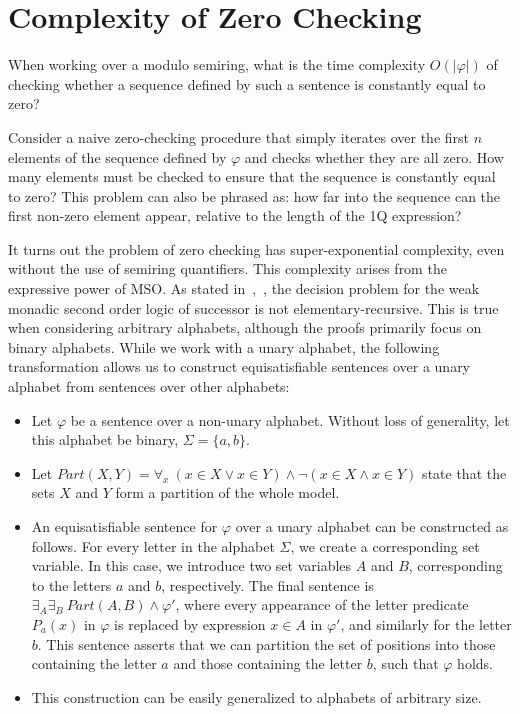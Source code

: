 \documentclass[en]{pracamgr}
\theoremstyle{definition}
\begin{document}
\section{Complexity of Zero Checking}
When working over a modulo semiring, what is the time complexity $O(|\varphi|)$ of checking whether a sequence defined by such a sentence is constantly equal to zero?

Consider a naive zero-checking procedure that simply iterates over the first $n$ elements of the sequence defined by $\varphi$ and checks whether they are all zero. How many elements must be checked to ensure that the sequence is constantly equal to zero? This problem can also be phrased as: how far into the sequence can the first non-zero element appear, relative to the length of the 1Q expression?

It turns out the problem of zero checking has super-exponential complexity, even without the use of semiring quantifiers. This complexity arises from the expressive power of MSO. As stated in~\cite{Stockmeyer},~\cite{Meyer}, the decision problem for the weak monadic second order logic of successor is not elementary-recursive. This is true when considering arbitrary alphabets, although the proofs primarily focus on binary alphabets. While we work with a unary alphabet, the following transformation allows us to construct equisatisfiable sentences over a unary alphabet from sentences over other alphabets:

\begin{itemize}
    \item Let $\varphi$ be a sentence over a non-unary alphabet. Without loss of generality, let this alphabet be binary, $\Sigma = \{a,b\}$.
    \item Let $Part(X,Y) = \forall_x \ (x \in X \lor x \in Y) \land \neg(x \in X \land x \in Y)$ state that the sets $X$ and $Y$ form a partition of the whole model.
    \item An equisatisfiable sentence for $\varphi$ over a unary alphabet can be constructed as follows. For every letter in the alphabet $\Sigma$, we create a corresponding set variable. In this case, we introduce two set variables $A$ and $B$, corresponding to the letters $a$ and $b$, respectively. The final sentence is $\exists_A\exists_B \ Part(A,B) \land \varphi'$, where every appearance of the letter predicate $P_a(x)$ in $\varphi$ is replaced by expression $x \in A$ in $\varphi'$, and similarly for the letter $b$. This sentence asserts that we can partition the set of positions into those containing the letter $a$ and those containing the letter $b$, such that $\varphi$ holds.
    \item This construction can be easily generalized to alphabets of arbitrary size.
\end{itemize}
\end{document}
